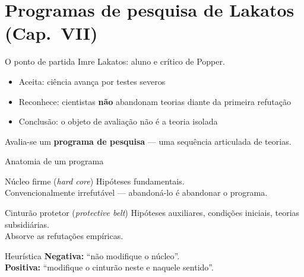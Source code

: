 \documentclass[aspectratio=169]{beamer}
\newcommand{\impt}[1]{\textcolor{maccent}{\textbf{#1}}}
\newcommand{\ntc}[1]{\textcolor{mprimary}{#1}}
\begin{document}
\section{Programas de pesquisa de Lakatos (Cap.~VII)}

\begin{frame}{O ponto de partida}
Imre Lakatos: aluno e crítico de Popper.
\vspace{0.3cm}
\pause
\begin{itemize}
  \item Aceita: ciência avança por testes severos
  \pause
  \item Reconhece: cientistas \impt{não} abandonam teorias diante da primeira refutação
  \pause
  \item Conclusão: o objeto de avaliação não é a teoria isolada
\end{itemize}
\vspace{0.4cm}
\pause
\begin{block}{}
Avalia-se um \impt{programa de pesquisa} --- uma sequência articulada de teorias.
\end{block}
\end{frame}

\begin{frame}{Anatomia de um programa}
\begin{block}{Núcleo firme (\emph{hard core})}
Hipóteses fundamentais. \\
\ntc{Convencionalmente irrefutável} --- abandoná-lo é abandonar o programa.
\end{block}
\pause
\begin{block}{Cinturão protetor (\emph{protective belt})}
Hipóteses auxiliares, condições iniciais, teorias subsidiárias. \\
\ntc{Absorve} as refutações empíricas.
\end{block}
\pause
\begin{block}{Heurística}
\impt{Negativa:} ``não modifique o núcleo''. \\
\impt{Positiva:} ``modifique o cinturão neste e naquele sentido''.
\end{block}
\end{frame}
\end{document}
